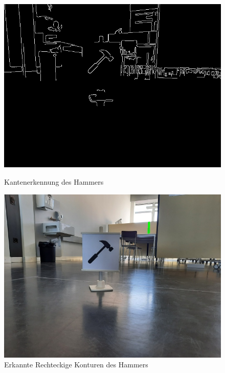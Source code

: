 \begin{figure}[H]
  \centering
  \begin{minipage}[t]{0.45\linewidth}
  \includegraphics[width=1.0\textwidth]{img/piktogrammerkennung/edge_hammer.jpg}
  \caption{Kantenerkennung des Hammers}
  \label{fig:edge-hammer}
  \end{minipage} 
  \hfill
  \begin{minipage}[t]{0.45\linewidth}
  \includegraphics[width=1.0\textwidth]{img/piktogrammerkennung/contours_hammer.jpg}
  \caption{Erkannte Rechteckige Konturen des Hammers}
  \label{fig:contour-hammer}
  \end{minipage}
\end{figure}

